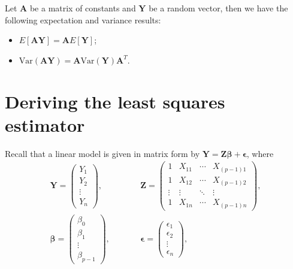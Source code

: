 \documentclass[
]{book}
\providecommand{\tightlist}{%
  \setlength{\itemsep}{0pt}\setlength{\parskip}{0pt}}
\begin{document}
Let \(\mathbf{A}\) be a matrix of constants and \(\mathbf{Y}\) be a random vector, then we have the following expectation and variance results:

\begin{itemize}
\tightlist
\item
  \(E[\mathbf{A}\mathbf{Y}] = \mathbf{A}E[\mathbf{Y}]\);\\
\item
  \(\text{Var}(\mathbf{A}\mathbf{Y}) = \mathbf{A} \text{Var}(\mathbf{Y}) \mathbf{A}^T\).
\end{itemize}

\hypertarget{Sec_Linear_LSE:derive}{%
\section{Deriving the least squares estimator}\label{Sec_Linear_LSE:derive}}

Recall that a linear model is given in matrix form by \(\mathbf{Y}=\mathbf{Z}\mathbf{\beta}+\mathbf{\epsilon}\), where\\

\begin{eqnarray*}
\mathbf{Y} = \begin{pmatrix} Y_1 \\ Y_2 \\ \vdots \\ Y_n \end{pmatrix}, &\qquad&
\mathbf{Z} = \begin{pmatrix}
1 & X_{11} & \cdots & X_{(p-1)1} \\
1 & X_{12} & \cdots & X_{(p-1)2} \\
\vdots & \vdots & \ddots & \vdots \\
1 & X_{1n} & \cdots & X_{(p-1)n} \end{pmatrix}, \\
\mathbf{\beta} =\begin{pmatrix} \beta_0 \\ \beta_1 \\ \vdots \\ \beta_{p-1} \end{pmatrix}, &\qquad&
\mathbf{\epsilon} = \begin{pmatrix} \epsilon_1 \\ \epsilon_2 \\ \vdots \\ \epsilon_n \end{pmatrix},
\end{eqnarray*}
\end{document}

